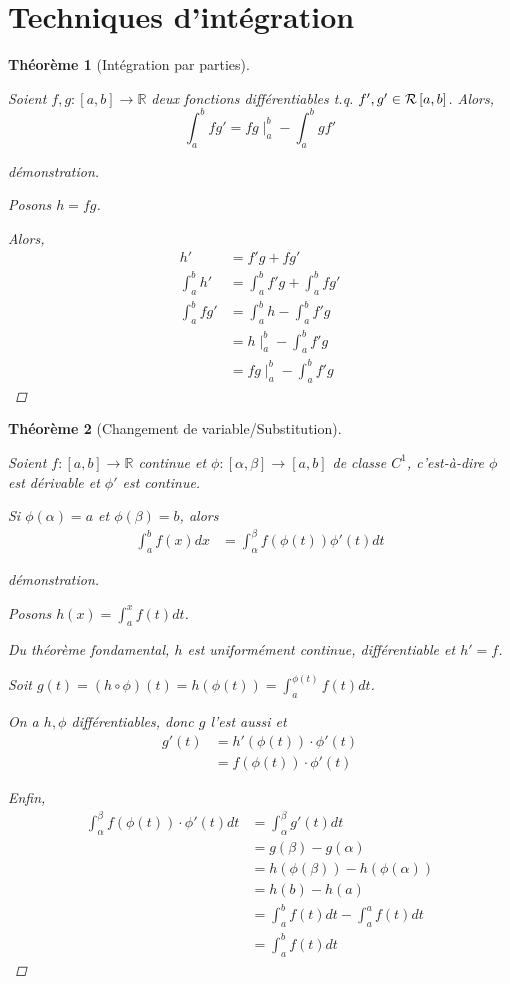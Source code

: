 \documentclass{report}
\newcommand*{\reels}{\mathbb{R}}
\newtheorem*{thm}{Th\'eor\`eme}
\theoremstyle{definition}
\theoremstyle{remark}
\begin{document}
	\section{Techniques d'int\'egration}
	\begin{thm}[Int\'egration par parties]~

		Soient $f,g:[a,b] \to \reels$ deux fonctions diff\'erentiables t.q. $f',g' \in \riemann$. Alors,
		\[
		\int_{a}^{b}fg'=fg\mid_a^b-\int_{a}^{b}gf'
		\]
		\begin{proof}[d\'emonstration]~

			Posons $h=fg$.

			Alors,
			\begin{align*}
				h'&= f'g + fg'\\
				\int_{a}^{b} h'&= \int_{a}^{b} f'g + \int_{a}^{b} fg'\\
				\int_{a}^{b} fg'&= \int_{a}^{b} h - \int_{a}^{b} f'g\\
				&= h\mid_a^b - \int_{a}^{b} f'g\\
				&= fg\mid_a^b - \int_{a}^{b} f'g
			\end{align*}
		\end{proof}
	\end{thm}
	\begin{thm}[Changement de variable/Substitution]~

		Soient $f:[a,b] \to \reels$ continue et $\phi:[\alpha,\beta] \to [a,b]$ de classe $C^1$, c'est-\`a-dire $\phi$ est d\'erivable et $\phi'$ est continue.

		Si $\phi(\alpha)=a$ et $\phi(\beta)=b$, alors
		\begin{align*}
			\int_{a}^{b}f(x) dx&= \int_{\alpha}^{\beta}f(\phi(t))\phi'(t) dt
		\end{align*}
		\begin{proof}[d\'emonstration]~

			Posons $h(x)=\int_{a}^{x}f(t) dt$.

			Du th\'eor\`eme fondamental, $h$ est uniform\'ement continue, diff\'erentiable et $h'=f$.

			Soit $g(t)=(h \circ \phi)(t) = h(\phi(t)) = \int_{a}^{\phi(t)}f(t) dt$.

			On a $h,\phi$ diff\'erentiables, donc $g$ l'est aussi et
			\begin{align*}
				g'(t)&= h'(\phi(t)) \cdot \phi'(t)\\
				&= f(\phi(t)) \cdot \phi'(t)
			\end{align*}

			Enfin,
			\begin{align*}
				\int_{\alpha}^{\beta}f(\phi(t)) \cdot \phi'(t) dt&= \int_{\alpha}^{\beta}g'(t) dt\\
				&= g(\beta)-g(\alpha)\\
				&= h(\phi(\beta)) - h(\phi(\alpha))\\
				&= h(b)-h(a)\\
				&= \int_{a}^{b}f(t) dt - \int_{a}^{a}f(t) dt\\
				&= \int_{a}^{b}f(t) dt
			\end{align*}
		\end{proof}
	\end{thm}
\end{document}
